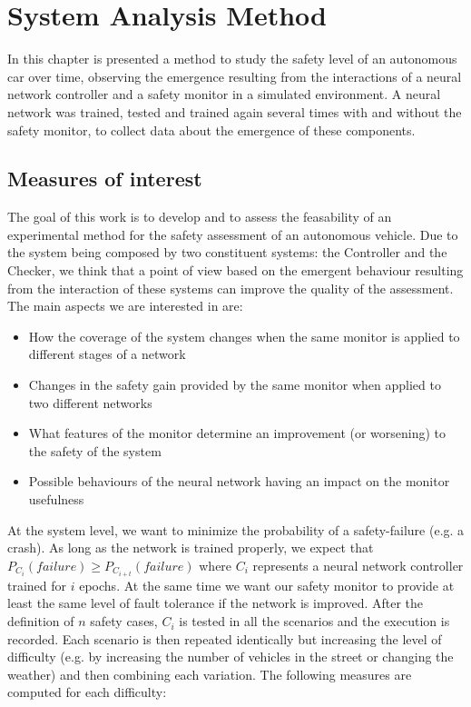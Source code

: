 \chapter{System Analysis Method}

In this chapter is presented a method to study the safety level of an autonomous car over time, observing the emergence resulting from the interactions of a neural network controller and a safety monitor in a simulated environment.\newline
A neural network was trained, tested and trained again several times with and without the safety monitor, to collect data about the emergence of these components.

\section{Measures of interest}

The goal of this work is to develop and to assess the feasability of an experimental method for the safety assessment of an autonomous vehicle. Due to the system being composed by two constituent systems: the Controller and the Checker, we think that a point of view based on the emergent behaviour resulting from the interaction of these systems can improve the quality of the assessment.\newline
The main aspects we are interested in are:

\begin{itemize}
	\item How the coverage of the system changes when the same monitor is applied to different stages of a network
	\item Changes in the safety gain provided by the same monitor when applied to two different networks
	\item What features of the monitor determine an improvement (or worsening) to the safety of the system
	\item Possible behaviours of the neural network having an impact on the monitor usefulness
\end{itemize}

At the system level, we want to minimize the probability of a safety-failure (e.g. a crash). As long as the network is trained properly, we expect that $P_{C_{i}}(failure) \geq P_{C_{i+t}}(failure)$ where $C_{i}$ represents a neural network controller trained for $i$ epochs. At the same time we want our safety monitor to provide at least the same level of fault tolerance if the network is improved.\newline
After the definition of $n$ safety cases, $C_{i}$ is tested in all the scenarios and the execution is recorded. Each scenario is then repeated identically but increasing the level of difficulty (e.g. by increasing the number of vehicles in the street or changing the weather) and then combining each variation. The following measures are computed for each difficulty:

